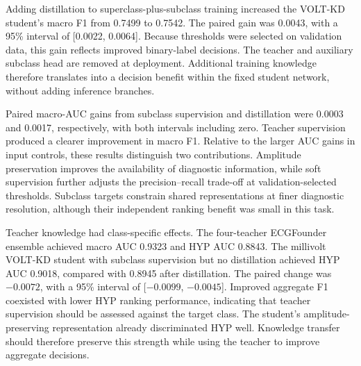 \documentclass[11pt,a4paper]{article}
\begin{document}
Adding distillation to superclass-plus-subclass training increased the VOLT-KD student's macro F1 from 0.7499 to 0.7542. The paired gain was 0.0043, with a 95\% interval of [0.0022, 0.0064]. Because thresholds were selected on validation data, this gain reflects improved binary-label decisions. The teacher and auxiliary subclass head are removed at deployment. Additional training knowledge therefore translates into a decision benefit within the fixed student network, without adding inference branches.

Paired macro-AUC gains from subclass supervision and distillation were 0.0003 and 0.0017, respectively, with both intervals including zero. Teacher supervision produced a clearer improvement in macro F1. Relative to the larger AUC gains in input controls, these results distinguish two contributions. Amplitude preservation improves the availability of diagnostic information, while soft supervision further adjusts the precision--recall trade-off at validation-selected thresholds. Subclass targets constrain shared representations at finer diagnostic resolution, although their independent ranking benefit was small in this task.

Teacher knowledge had class-specific effects. The four-teacher ECGFounder ensemble achieved macro AUC 0.9323 and HYP AUC 0.8843. The millivolt VOLT-KD student with subclass supervision but no distillation achieved HYP AUC 0.9018, compared with 0.8945 after distillation. The paired change was $-0.0072$, with a 95\% interval of [$-0.0099$, $-0.0045$]. Improved aggregate F1 coexisted with lower HYP ranking performance, indicating that teacher supervision should be assessed against the target class. The student's amplitude-preserving representation already discriminated HYP well. Knowledge transfer should therefore preserve this strength while using the teacher to improve aggregate decisions.
\end{document}
